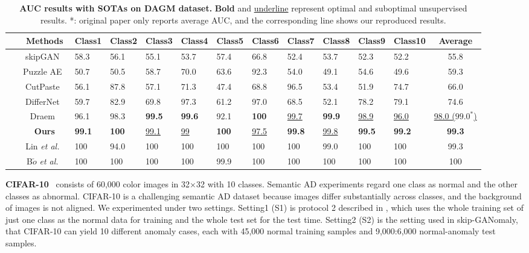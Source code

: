 \documentclass[lettersize,journal]{IEEEtran}
\begin{document}
\begin{table*}\normalsize
	\centering
	\small
	\renewcommand{\arraystretch}{1.1}
	\setlength\tabcolsep{8pt}
	\caption{\textbf{AUC results with SOTAs on DAGM dataset.} \textbf{Bold} and \underline{underline} represent optimal and suboptimal unsupervised results. *: original paper only reports average AUC, and the corresponding line shows our reproduced results.}
	\begin{tabular}{C{3pt} | c |C{20pt} C{20pt} C{20pt} C{20pt} C{20pt} C{20pt} C{20pt} C{20pt} C{20pt} C{23pt} |c}\hline
		\specialrule{0em}{1pt}{0pt}
		~ & Methods & Class1 & Class2 & Class3 & Class4 & Class5 & Class6 & Class7 & Class8 & Class9 & Class10 & Average\\
		\hline
		 & skipGAN~\cite{akccay2019skip} & 58.3 & 56.1 & 55.1 & 53.7 & 57.4 & 66.8 & 52.4 & 53.7 & 52.3 & 52.2 & 55.8\\
		~ & Puzzle AE~\cite{salehi2020puzzle} & 50.7 & 50.5 & 58.7 & 70.0 & 63.6 & 92.3 & 54.0 & 49.1 & 54.6 & 49.6 & 59.3\\
		~ & CutPaste~\cite{li2021cutpaste} & 56.1 & 87.8 & 57.1 & 71.3 & 47.4 & 68.8 & 96.5 & 53.4 & 51.9 & 74.7 & 66.0\\
		~ & DifferNet~\cite{rudolph2021same} & 59.7 & 82.9 & 69.8 & 97.3 & 61.2 & 97.0 & 68.5 & 52.1 & 78.2 & 79.1 & 74.6\\
		~ & Draem~\cite{zavrtanik2021draem} & 96.1 & 98.3 & \textbf{99.5} & \textbf{99.6} & 92.1 & \textbf{100} & \underline{99.7} & \textbf{99.9} & \underline{98.9} & \underline{96.0} & \underline{98.0 ($99.0^*$)}\\
~ & \textbf{Ours} & \textbf{99.1} & \textbf{100} & \underline{99.1} & \underline{99} & \textbf{100} & \underline{97.5} & \textbf{99.8} & \underline{99.8} & \textbf{99.5} & \textbf{99.2} & \textbf{99.3}\\
		\hline
		 & Lin \textit{et al.}~\cite{lin2020efficient} & 100 & 94.0 & 100 & 100 & 100 & 100 & 100 & 99.0 & 100 & 100 & 99.3\\
		~ & B$\check{o}$ \textit{et al.}~\cite{bovzivc2021end} & 100 & 100 & 100 & 100 & 99.9 & 100 & 100 & 100 & 100 & 100 & 100\\
		\hline
	\end{tabular}
	\label{table:DGAM}
\end{table*}

\noindent\textbf{CIFAR-10}~\cite{krizhevsky2009learning} consists of 60,000 color images in 32$\times$32 with 10 classes. Semantic AD experiments regard one class as normal and the other classes as abnormal. CIFAR-10 is a challenging semantic AD dataset because images differ substantially across classes, and the background of images is not aligned. We experimented under two settings. Setting1 (S1) is protocol 2 described in \cite{perera2019ocgan}, which uses the whole training set of just one class as the normal data for training and the whole test set for the test time. Setting2 (S2) is the setting used in skip-GANomaly, that CIFAR-10 can yield 10 different anomaly cases, each with 45,000 normal training samples and 9,000:6,000 normal-anomaly test samples.
\end{document}
